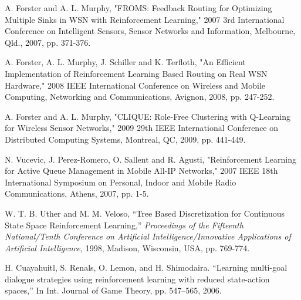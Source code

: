 \documentclass[journal]{IEEEtran}
\begin{document}
\begin{thebibliography}{1}
A. Forster and A. L. Murphy, "FROMS: Feedback Routing for Optimizing Multiple Sinks in WSN with Reinforcement Learning," 2007 3rd International Conference on Intelligent Sensors, Sensor Networks and Information, Melbourne, Qld., 2007, pp. 371-376.

A. Forster, A. L. Murphy, J. Schiller and K. Terfloth, "An Efficient Implementation of Reinforcement Learning Based Routing on Real WSN Hardware," 2008 IEEE International Conference on Wireless and Mobile Computing, Networking and Communications, Avignon, 2008, pp. 247-252.

A. Forster and A. L. Murphy, "CLIQUE: Role-Free Clustering with Q-Learning for Wireless Sensor Networks," 2009 29th IEEE International Conference on Distributed Computing Systems, Montreal, QC, 2009, pp. 441-449.

N. Vucevic, J. Perez-Romero, O. Sallent and R. Agusti, "Reinforcement Learning for Active Queue Management in Mobile All-IP Networks," 2007 IEEE 18th International Symposium on Personal, Indoor and Mobile Radio Communications, Athens, 2007, pp. 1-5.

W. T. B. Uther and M. M. Veloso, ``Tree Based Discretization for Continuous State Space Reinforcement Learning,'' \emph{Proceedings of the Fifteenth National/Tenth Conference on Artificial Intelligence/Innovative Applications of Artificial Intelligence,} 1998, Madison, Wisconsin, USA, pp. 769-774.

H. Cuayahuitl, S. Renals, O. Lemon, and H. Shimodaira. ``Learning multi-goal dialogue strategies using reinforcement learning with reduced state-action spaces,'' In Int. Journal of Game Theory, pp. 547–565, 2006.
\end{thebibliography}


\end{document}
